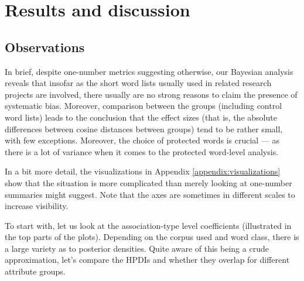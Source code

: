 \documentclass{clv3}
\begin{document}
\normalsize

\hypertarget{results-and-discussion}{%
\section{Results and discussion}\label{results-and-discussion}}

\label{sec:results}

\vspace{1mm}

\normalsize

\hypertarget{observations}{%
\subsection{Observations}\label{observations}}

\label{subsec:observations}

In brief, despite one-number metrics suggesting otherwise, our Bayesian
analysis reveals that insofar as the short word lists usually used in
related research projects are involved, there usually are no strong
reasons to claim the presence of systematic bias. Moreover, comparison
between the groups (including control word lists) leads to the
conclusion that the effect sizes (that is, the absolute differences
between cosine distances between groups) tend to be rather small, with
few exceptions. Moreover, the choice of protected words is crucial ---
as there is a lot of variance when it comes to the protected word-level
analysis.

In a bit more detail, the visualizations in Appendix
\ref{appendix:visualizations} show that the situation is more
complicated than merely looking at one-number summaries might suggest.
Note that the axes are sometimes in different scales to increase
visibility.

To start with, let us look at the association-type level coefficients
(illustrated in the top parts of the plots). Depending on the corpus
used and word class, there is a large variety as to posterior
densities. Quite aware of this being a crude approximation, let's
compare the HPDIs and whether they overlap for different attribute
groups.
\end{document}
